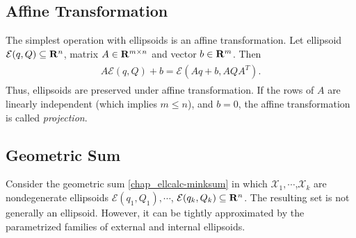 \documentclass[letterpaper,10pt,english]{sphinxmanual}
\begin{document}
\subsection{Affine Transformation}
\label{chap_ellcalc:affine-transformation}
The simplest operation with ellipsoids is an affine transformation. Let
ellipsoid ${\mathcal E}(q,Q)\subseteq{\bf R}^n$, matrix
$A\in{\bf R}^{m\times n}$ and vector $b\in{\bf R}^m$. Then
\label{chap_ellcalc:equation-affinetrans}\begin{gather}
\begin{split}A{\mathcal E}(q,Q) + b = {\mathcal E}(Aq+b, AQA^T) .\end{split}\label{chap_ellcalc-affinetrans}
\end{gather}
Thus, ellipsoids are preserved under affine transformation. If the rows
of $A$ are linearly independent (which implies
$m\leqslant n$), and $b=0$, the affine transformation is
called \emph{projection}.


\subsection{Geometric Sum}
\label{chap_ellcalc:geometric-sum}
Consider the geometric sum \eqref{chap_ellcalc-minksum} in which
${\mathcal X}_1,\cdots$,${\mathcal X}_k$ are nondegenerate
ellipsoids ${\mathcal E}(q_1,Q_1),\cdots$,
${\mathcal E}(q_k,Q_k)\subseteq{\bf R}^n$. The resulting set is
not generally an ellipsoid. However, it can be tightly approximated by
the parametrized families of external and internal ellipsoids.
\end{document}
